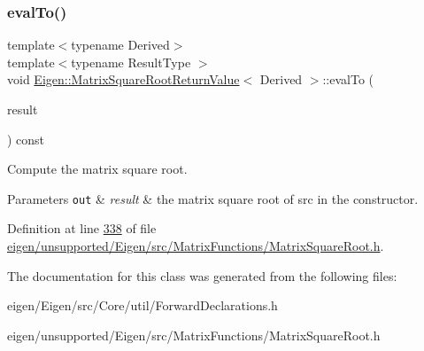 \mbox{\label{class_eigen_1_1_matrix_square_root_return_value_a97577165569edcf19429c7748b670e51}} 
\subsubsection{\texorpdfstring{eval\+To()}{evalTo()}\hspace{0.1cm}{\footnotesize\ttfamily [2/2]}}
{\footnotesize\ttfamily template$<$typename Derived$>$ \\
template$<$typename Result\+Type $>$ \\
void \hyperlink{class_eigen_1_1_matrix_square_root_return_value}{Eigen\+::\+Matrix\+Square\+Root\+Return\+Value}$<$ Derived $>$\+::eval\+To (\begin{DoxyParamCaption}\item[{Result\+Type \&}]{result }\end{DoxyParamCaption}) const\hspace{0.3cm}{\ttfamily [inline]}}



Compute the matrix square root. 


\begin{DoxyParams}[1]{Parameters}
\mbox{\tt out}  & {\em result} & the matrix square root of {\ttfamily src} in the constructor. \\
\hline
\end{DoxyParams}


Definition at line \hyperlink{eigen_2unsupported_2_eigen_2src_2_matrix_functions_2_matrix_square_root_8h_source_l00338}{338} of file \hyperlink{eigen_2unsupported_2_eigen_2src_2_matrix_functions_2_matrix_square_root_8h_source}{eigen/unsupported/\+Eigen/src/\+Matrix\+Functions/\+Matrix\+Square\+Root.\+h}.



The documentation for this class was generated from the following files\+:\begin{DoxyCompactItemize}
\item 
eigen/\+Eigen/src/\+Core/util/\+Forward\+Declarations.\+h\item 
eigen/unsupported/\+Eigen/src/\+Matrix\+Functions/\+Matrix\+Square\+Root.\+h\end{DoxyCompactItemize}
